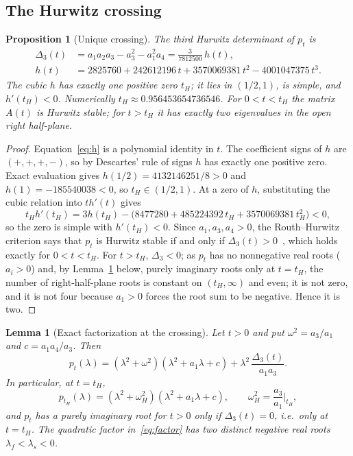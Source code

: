 \documentclass[11pt,a4paper]{article}
\theoremstyle{plain}
\newtheorem{proposition}[theorem]{Proposition}
\newtheorem{lemma}[theorem]{Lemma}
\theoremstyle{definition}
\theoremstyle{remark}
\begin{document}
\subsection{The Hurwitz crossing}

\begin{proposition}[Unique crossing]\label{prop:crossing}
The third Hurwitz determinant of $p_t$ is
\begin{equation}\label{eq:h}
\begin{aligned}
\Delta_3(t)&=a_1a_2a_3-a_3^2-a_1^2a_4=\frac{3}{7812500}\,h(t),\\
h(t)&=2825760+242612196\,t+3570069381\,t^2-4001047375\,t^3 .
\end{aligned}
\end{equation}
The cubic $h$ has exactly one positive zero $t_H$; it lies in $(1/2,1)$, is simple, and $h'(t_H)<0$. Numerically $t_H\approx0.956453654736546$. For $0<t<t_H$ the matrix $A(t)$ is Hurwitz stable; for $t>t_H$ it has exactly two eigenvalues in the open right half-plane.
\end{proposition}

\begin{proof}
Equation~\eqref{eq:h} is a polynomial identity in $t$. The coefficient signs of $h$ are $(+,+,+,-)$, so by Descartes' rule of signs $h$ has exactly one positive zero. Exact evaluation gives $h(1/2)=4132146251/8>0$ and $h(1)=-185540038<0$, so $t_H\in(1/2,1)$. At a zero of $h$, substituting the cubic relation into $th'(t)$ gives
\[
t_Hh'(t_H)=3h(t_H)-\bigl(8477280+485224392\,t_H+3570069381\,t_H^2\bigr)<0 ,
\]
so the zero is simple with $h'(t_H)<0$. Since $a_1,a_3,a_4>0$, the Routh--Hurwitz criterion says that $p_t$ is Hurwitz stable if and only if $\Delta_3(t)>0$~\cite[Chapter~XV]{Gantmacher1959}, which holds exactly for $0<t<t_H$. For $t>t_H$, $\Delta_3<0$; as $p_t$ has no nonnegative real roots ($a_i>0$) and, by Lemma~\ref{lem:factor} below, purely imaginary roots only at $t=t_H$, the number of right-half-plane roots is constant on $(t_H,\infty)$ and even; it is not zero, and it is not four because $a_1>0$ forces the root sum to be negative. Hence it is two.
\end{proof}

\begin{lemma}[Exact factorization at the crossing]\label{lem:factor}
Let $t>0$ and put $\omega^2=a_3/a_1$ and $c=a_1a_4/a_3$. Then
\begin{equation}\label{eq:factorid}
p_t(\lambda)=(\lambda^2+\omega^2)(\lambda^2+a_1\lambda+c)+\lambda^2\,\frac{\Delta_3(t)}{a_1a_3}.
\end{equation}
In particular, at $t=t_H$,
\begin{equation}\label{eq:factor}
p_{t_H}(\lambda)=(\lambda^2+\omega_H^2)(\lambda^2+a_1\lambda+c),\qquad \omega_H^2=\frac{a_3}{a_1}\Big|_{t_H},
\end{equation}
and $p_t$ has a purely imaginary root for $t>0$ only if $\Delta_3(t)=0$, i.e.\ only at $t=t_H$. The quadratic factor in~\eqref{eq:factor} has two distinct negative real roots $\lambda_f<\lambda_s<0$.
\end{lemma}
\end{document}
